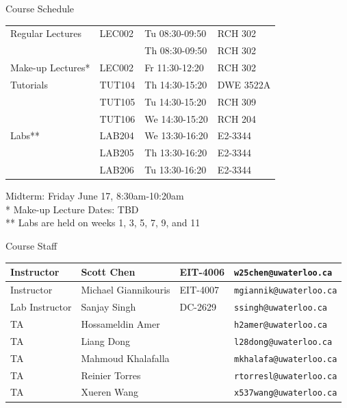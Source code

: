 \documentclass{beamer}
\begin{document}
	\begin{frame}{Course Schedule}
		\begin{center}
			\begin{tabular}{l l l l}
				Regular Lectures & LEC002 & Tu 08:30-09:50 & RCH 302 	\\
								 & 		  & Th 08:30-09:50 & RCH 302 	\\
				\hline
				Make-up Lectures*& LEC002 & Fr 11:30-12:20 & RCH 302 	\\
				\hline			
				Tutorials 		 & TUT104 & Th 14:30-15:20 & DWE 3522A 	\\
						  		 & TUT105 & Tu 14:30-15:20 & RCH 309   	\\
						  		 & TUT106 & We 14:30-15:20 & RCH 204   	\\
				\hline			
				Labs** 	  		 & LAB204 & We 13:30-16:20 & E2-3344	\\
								 & LAB205 & Th 13:30-16:20 & E2-3344	\\
								 & LAB206 & Tu 13:30-16:20 & E2-3344	\\
				\hline
			\end{tabular}
		\end{center}		
		Midterm: Friday June 17, 8:30am-10:20am				\\
		*    Make-up Lecture Dates: TBD						\\
		**   Labs are held on weeks 1, 3, 5, 7, 9, and 11 	\\
	\end{frame}
	
	\begin{frame}{Course Staff}
		\begin{center}
		\begin{footnotesize}
		\begin{tabular}{l|l|l|l}
        Instructor & Scott Chen & EIT-4006 & \texttt{w25chen@uwaterloo.ca} \\
        \hline
        Instructor & Michael Giannikouris & EIT-4007 & \texttt{mgiannik@uwaterloo.ca} \\
        \hline
        Lab Instructor & Sanjay Singh & DC-2629 & \texttt{ssingh@uwaterloo.ca}\\
        \hline
        TA & Hossameldin Amer &  & \texttt{h2amer@uwaterloo.ca} \\
        TA & Liang Dong &  & \texttt{l28dong@uwaterloo.ca} \\
        TA & Mahmoud Khalafalla &  & \texttt{mkhalafa@uwaterloo.ca} \\
        TA & Reinier Torres & & \texttt{rtorresl@uwaterloo.ca} \\
        TA & Xueren Wang & & \texttt{x537wang@uwaterloo.ca} \\
        \end{tabular}
        \end{footnotesize}
		\end{center}
	\end{frame}
	
\end{document}
